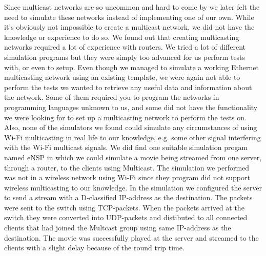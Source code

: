 \documentclass[9pt,a4paper]{acmproc}
\begin{document}
Since multicast networks are so uncommon and hard to come by we later felt the need to simulate these networks instead of implementing one of our own. While it’s obviously not impossible to create a multicast network, we did not have the knowledge or experience to do so. We found out that creating multicasting networks required a lot of experience with routers. We tried a lot of different simulation programs but they were simply too advanced for us perform tests with, or even to setup. Even though we managed to simulate a working Ethernet multicasting network using an existing template, we were again not able to perform the tests we wanted to retrieve any useful data and information about the network. Some of them required you to program the networks in programming languages unknown to us, and some did not have the functionality we were looking for to set up a multicasting network to perform the tests on. Also, none of the simulators we found could simulate any circumstances of using Wi-Fi multicasting in real life to our knowledge, e.g. some other signal interfering with the Wi-Fi multicast signals.
We did find one suitable simulation progam named eNSP in which we could simulate a movie being streamed from one server, through a router, to the clients using Multicast. The simulation we performed was not in a wireless network using Wi-Fi since they program did not support wireless multicasting to our knowledge. In the simulation we configured the server to send a stream with a D-classified IP-address as the destination. The packets were sent to the switch using TCP-packets. When the packets arrived at the switch they were converted into UDP-packets and distibuted to all connected clients that had joined the Multcast group using same IP-address as the destination. The movie was successfully played at the server and streamed to the clients with a slight delay because of the round trip time.
\end{document}
